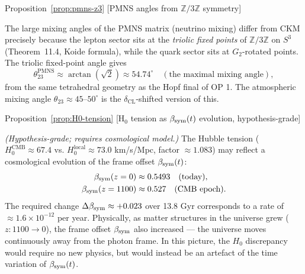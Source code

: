 \begin{qsarchived}{Proposition~\ref{prop:pmns-z3} [PMNS angles from $\mathbb{Z}/3\mathbb{Z}$ symmetry]}
\begin{proposition}

The large mixing angles of the PMNS matrix (neutrino mixing) differ
from CKM precisely because the lepton sector sits at the
\emph{triolic fixed points} of $\mathbb{Z}/3\mathbb{Z}$ on $S^3$
(Theorem~11.4, Koide formula), while the quark sector sits at
$G_2$-rotated points. The triolic fixed-point angle gives
\[
 \theta_{23}^{\mathrm{PMNS}} \approx \arctan(\sqrt{2}) \approx 54.74^\circ
 \quad (\text{the maximal mixing angle}),
\]
from the same tetrahedral geometry as the Hopf final of OP 1.
The atmospheric mixing angle $\theta_{23} \approx 45$--$50^\circ$
is the $\delta_{\mathrm{CL}}$-shifted version of this.
\end{proposition}
\end{qsarchived}

\begin{qsarchived}{Proposition~\ref{prop:H0-tension} [H$_0$ tension as $\beta_{\mathrm{sym}}(t)$ evolution, hypothesis-grade]}
\begin{proposition}

\emph{(Hypothesis-grade; requires cosmological model.)}
The Hubble tension ($H_0^{\mathrm{CMB}} \approx 67.4$ vs.
$H_0^{\mathrm{local}} \approx 73.0$ km/s/Mpc, factor $\approx 1.083$)
may reflect a cosmological evolution of the frame offset $\beta_{\mathrm{sym}}(t)$:
\begin{align*}
 \beta_{\mathrm{sym}}(z=0) &\approx 0.5493 \quad \text{(today)}, \\
 \beta_{\mathrm{sym}}(z=1100) &\approx 0.527 \quad \text{(CMB epoch)}.
\end{align*}
The required change $\Delta\beta_{\mathrm{sym}} \approx +0.023$ over 13.8 Gyr
corresponds to a rate of $\approx 1.6\times 10^{-12}$ per year.
Physically, as matter structures in the universe grew ($z: 1100\to 0$),
the frame offset $\beta_{\mathrm{sym}}$ also increased --- the universe moves
continuously away from the photon frame.
In this picture, the $H_0$ discrepancy would require no new physics,
but would instead be an artefact of the time variation of $\beta_{\mathrm{sym}}(t)$.
\end{proposition}
\end{qsarchived}

